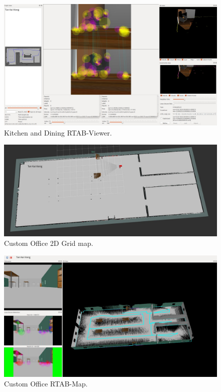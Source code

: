 \documentclass[10pt,journal,compsoc]{IEEEtran}
\begin{document}
\begin{figure}[thpb]
      \centering
      \includegraphics[width=\linewidth]{kitchen_rtabviewer.png}
      \caption{Kitchen and Dining RTAB-Viewer.}
      \label{fig:robot7}
\end{figure}

\begin{figure}[thpb]
      \centering
      \includegraphics[width=\linewidth]{custom_office_gridmap.png}
      \caption{Custom Office 2D Grid map.}
      \label{fig:robot8}
\end{figure}

\begin{figure}[thpb]
      \centering
      \includegraphics[width=\linewidth]{custom_office_rtabmap.png}
      \caption{Custom Office RTAB-Map.}
      \label{fig:robot9}
\end{figure}
\end{document}
